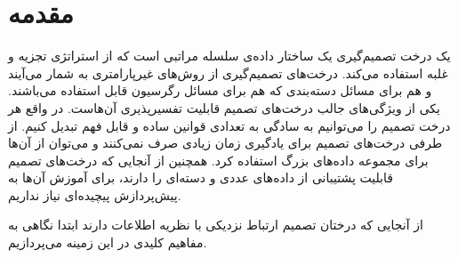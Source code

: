 \section{مقدمه}

یک درخت تصمیم‌گیری یک ساختار داده‌ی سلسله مراتبی است که از استراتژی تجزیه و غلبه استفاده می‌کند.
درخت‌های تصمیم‌گیری از روش‌های غیرپارامتری به شمار می‌آیند و هم برای مسائل دسته‌بندی که هم برای مسائل رگرسیون قابل استفاده می‌باشند. یکی از ویژگی‌های جالب درخت‌های تصمیم قابلیت تفسیر‌پذیری آن‌هاست. در واقع هر درخت تصمیم را می‌توانیم به سادگی به تعدادی قوانین ساده و قابل فهم تبدیل کنیم. از طرفی درخت‌های تصمیم برای یادگیری زمان زیادی صرف نمی‌کنند و می‌توان از آن‌ها برای مجموعه داده‌های بزرگ استفاده کرد. همچنین از آنجایی که درخت‌های تصمیم قابلیت پشتیبانی از داده‌های عددی و دسته‌ای را دارند، برای آموزش آن‌ها به پیش‌پردازش پیچیده‌ای نیاز نداریم.

از آنجایی که درختان تصمیم ارتباط نزدیکی با نظریه اطلاعات دارند ابتدا نگاهی به مفاهیم کلیدی در این زمینه می‌پردازیم.